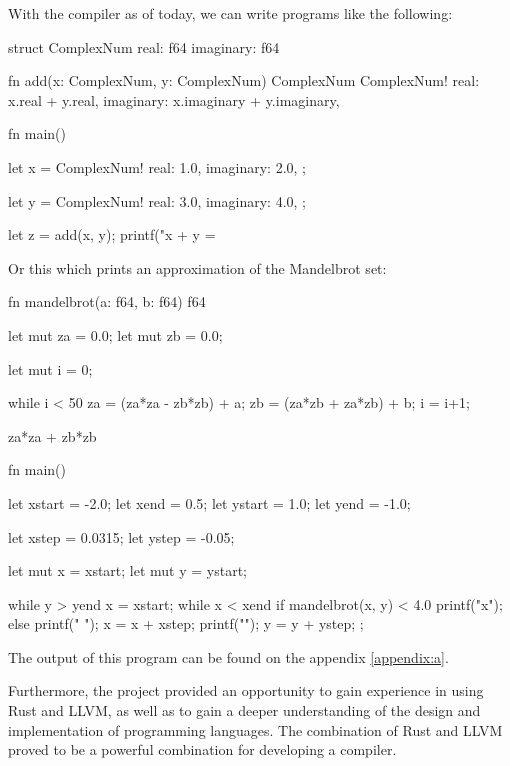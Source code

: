 ﻿\documentclass[10pt,a4paper,twocolumn,twoside]{article}
\begin{document}
With the compiler as of today, we can write programs like the following:

\begin{code}
struct ComplexNum {
    real:      f64
    imaginary: f64
}

fn add(x: ComplexNum, y: ComplexNum) ComplexNum {
    ComplexNum!{
        real: x.real + y.real,
        imaginary: x.imaginary + y.imaginary,
    }
}

fn main() {
    let x = ComplexNum!{
        real: 1.0,
        imaginary: 2.0,
    };

    let y = ComplexNum!{
        real: 3.0,
        imaginary: 4.0,
    };

    let z = add(x, y);
    printf("x + y = %
}
\end{code}

Or this which prints an approximation of the Mandelbrot set:
\newpage

\begin{code}
fn mandelbrot(a: f64, b: f64) f64 {
    let mut za = 0.0;
    let mut zb = 0.0;

    let mut i = 0;

    while i < 50 {
        za = (za*za - zb*zb) + a;
        zb = (za*zb + za*zb) + b;
        i = i+1;
    }

    za*za + zb*zb
}

fn main() {
    let xstart = -2.0;
    let xend = 0.5;
    let ystart = 1.0;
    let yend = -1.0;

    let xstep = 0.0315;
    let ystep = -0.05;

    let mut x = xstart;
    let mut y = ystart;

    while y > yend {
        x = xstart;
        while x < xend {
            if mandelbrot(x, y) < 4.0 {
                printf("x");
            } else {
                printf(" ");
            }
            x = x + xstep; 
        }
        printf("\n");
        y = y + ystep;
    };
}
\end{code}

The output of this program can be found on the appendix \ref{appendix:a}.

Furthermore, the project provided an opportunity to gain experience in using
Rust and LLVM, as well as to gain a deeper understanding of the design and
implementation of programming languages. The combination of Rust and LLVM proved
to be a powerful combination for developing a compiler.
\end{document}

